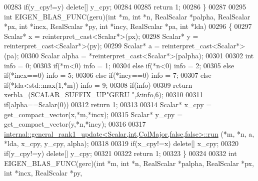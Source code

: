 \begin{DoxyCode}
00283   \textcolor{keywordflow}{if}(y\_cpy!=y)  \textcolor{keyword}{delete}[] y\_cpy;
00284 
00285   \textcolor{keywordflow}{return} 1;
00286 \}
00287 
00295 \textcolor{keywordtype}{int} EIGEN\_BLAS\_FUNC(geru)(\textcolor{keywordtype}{int} *m, \textcolor{keywordtype}{int} *n, RealScalar *palpha, RealScalar *px, \textcolor{keywordtype}{int} *incx, RealScalar *py, \textcolor{keywordtype}{
      int} *incy, RealScalar *pa, \textcolor{keywordtype}{int} *lda)
00296 \{
00297   Scalar* x = \textcolor{keyword}{reinterpret\_cast<}Scalar*\textcolor{keyword}{>}(px);
00298   Scalar* y = \textcolor{keyword}{reinterpret\_cast<}Scalar*\textcolor{keyword}{>}(py);
00299   Scalar* a = \textcolor{keyword}{reinterpret\_cast<}Scalar*\textcolor{keyword}{>}(pa);
00300   Scalar alpha = *\textcolor{keyword}{reinterpret\_cast<}Scalar*\textcolor{keyword}{>}(palpha);
00301 
00302   \textcolor{keywordtype}{int} info = 0;
00303        \textcolor{keywordflow}{if}(*m<0)                                                       info = 1;
00304   \textcolor{keywordflow}{else} \textcolor{keywordflow}{if}(*n<0)                                                       info = 2;
00305   \textcolor{keywordflow}{else} \textcolor{keywordflow}{if}(*incx==0)                                                   info = 5;
00306   \textcolor{keywordflow}{else} \textcolor{keywordflow}{if}(*incy==0)                                                   info = 7;
00307   \textcolor{keywordflow}{else} \textcolor{keywordflow}{if}(*lda<std::max(1,*m))                                        info = 9;
00308   \textcolor{keywordflow}{if}(info)
00309     \textcolor{keywordflow}{return} xerbla\_(SCALAR\_SUFFIX\_UP\textcolor{stringliteral}{"GERU "},&info,6);
00310 
00311   \textcolor{keywordflow}{if}(alpha==Scalar(0))
00312     \textcolor{keywordflow}{return} 1;
00313 
00314   Scalar* x\_cpy = get\_compact\_vector(x,*m,*incx);
00315   Scalar* y\_cpy = get\_compact\_vector(y,*n,*incy);
00316 
00317   \hyperlink{structinternal_1_1general__rank1__update}{internal::general\_rank1\_update<Scalar,int,ColMajor,false,false>::run}
      (*m, *n, a, *lda, x\_cpy, y\_cpy, alpha);
00318 
00319   \textcolor{keywordflow}{if}(x\_cpy!=x)  \textcolor{keyword}{delete}[] x\_cpy;
00320   \textcolor{keywordflow}{if}(y\_cpy!=y)  \textcolor{keyword}{delete}[] y\_cpy;
00321 
00322   \textcolor{keywordflow}{return} 1;
00323 \}
00324 
00332 \textcolor{keywordtype}{int} EIGEN\_BLAS\_FUNC(gerc)(\textcolor{keywordtype}{int} *m, \textcolor{keywordtype}{int} *n, RealScalar *palpha, RealScalar *px, \textcolor{keywordtype}{int} *incx, RealScalar *py, \textcolor{keywordtype}{
}
\end{DoxyCode}
